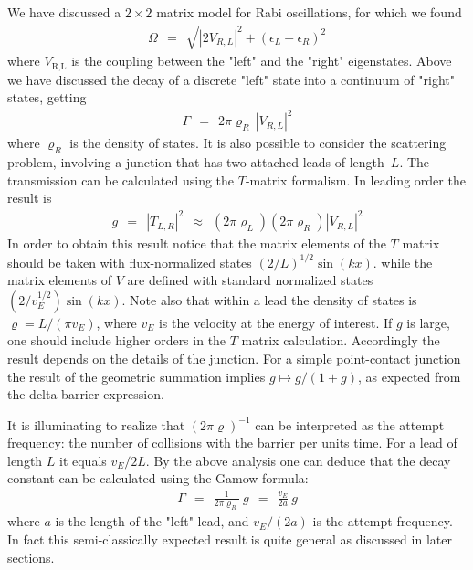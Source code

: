 \documentclass[onecolumn,fleqn, 11pt]{revtex4}
\newcommand{\beq}{\begin{eqnarray}}
\newcommand{\eeq}{\end{eqnarray}}
\begin{document}
We have discussed a $2\times 2$ matrix model for Rabi oscillations, 
for which we found 
\beq
\Omega \ \ = \ \ \sqrt { |2V_{R,L}|^2 + (\epsilon_L-\epsilon_R)^2 } 
\eeq
where $V_{\text{R,L}}$ is the coupling between the "left" and the "right" eigenstates.   
Above we have discussed the decay of a discrete "left" state 
into a continuum of "right" states, getting
\beq
\Gamma  \ \ = \ \ 2\pi\varrho_R \, |V_{R,L}|^2
\eeq
where $\varrho_R$ is the density of states. 
It is also possible to consider the scattering problem,  
involving a junction that has two attached leads of length~$L$. 
The transmission can be calculated using the $T$-matrix 
formalism. In leading order the result is 
\beq
g \ \ = \ \  |T_{L,R}|^2 \ \ \approx \ \ (2\pi\varrho_L) (2\pi\varrho_R) |V_{R,L}|^2 
\eeq
In order to obtain this result notice that 
the matrix elements of the $T$ matrix should be 
taken with flux-normalized states ${(2/L)^{1/2}\sin(kx)}$. 
while the matrix elements of $V$ are defined  
with standard normalized states ${ (2/v_E^{1/2}) \sin(kx)}$. 
Note also that within a lead the density 
of states is ${\varrho=L/(\pi v_E)}$, where $v_E$ 
is the velocity at the energy of interest.    
If $g$ is large, one should include higher orders in the $T$ matrix calculation. 
Accordingly the result depends on the details of the junction. 
For a simple point-contact junction the result 
of the geometric summation implies ${g \mapsto g/(1+g)}$, 
as expected from the delta-barrier expression. 


It is illuminating to realize that $(2\pi\varrho)^{-1}$ 
can be interpreted as the attempt frequency: 
the number of collisions with the barrier per units time. 
For a lead of length $L$ it equals ${v_E/2L}$. 
By the above analysis one can deduce that the decay constant 
can be calculated using the Gamow formula:
\beq
\Gamma \ \ = \ \ \frac{1}{2\pi\varrho_R} \ g  \ \ = \ \ \frac{v_E}{2a} \ g 
\eeq   
where $a$ is the length of the "left" lead, 
and $v_E/(2a)$ is the attempt frequency. 
In fact this semi-classically expected result 
is quite general as discussed in later sections.
\end{document}
